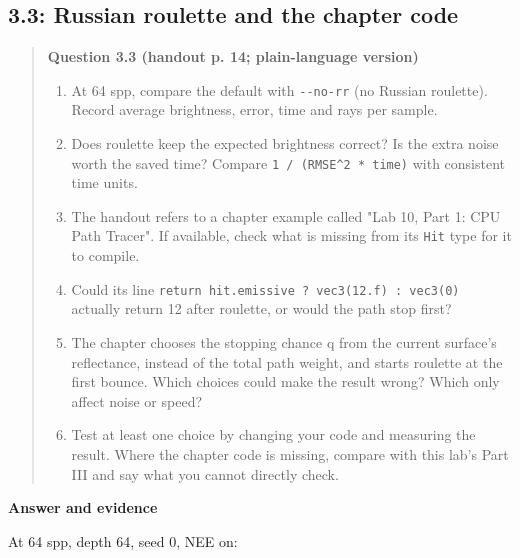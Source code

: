 \documentclass[11pt,a4paper]{article}
\begin{document}
\subsection*{3.3: Russian roulette and the chapter code}
\begin{quote}\small
\textbf{Question 3.3 (handout p. 14; plain-language version)}


\begin{enumerate}
\item At 64 spp, compare the default with \texttt{-{}-no-rr} (no Russian roulette). Record average brightness, error, time and rays per sample.
\item Does roulette keep the expected brightness correct? Is the extra noise worth the saved time? Compare \texttt{1 /\allowbreak{} (RMSE\textasciicircum{}2 * time)} with consistent time units.
\item The handout refers to a chapter example called "Lab 10, Part 1: CPU Path Tracer". If available, check what is missing from its \texttt{Hit} type for it to compile.
\item Could its line \texttt{return hit.emissive ? vec3(12.f) : vec3(0)} actually return 12 after roulette, or would the path stop first?
\item The chapter chooses the stopping chance q from the current surface's reflectance, instead of the total path weight, and starts roulette at the first bounce. Which choices could make the result wrong? Which only affect noise or speed?
\item Test at least one choice by changing your code and measuring the result. Where the chapter code is missing, compare with this lab's Part III and say what you cannot directly check.
\end{enumerate}\end{quote}
\textbf{Answer and evidence}


At 64 spp, depth 64, seed 0, NEE on:
\end{document}
